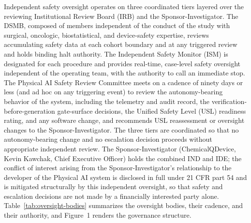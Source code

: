 Independent safety oversight operates on three coordinated tiers layered over the
reviewing Institutional Review Board (IRB) and the Sponsor-Investigator. The DSMB,
composed of members independent of the conduct of the study with surgical,
oncologic, biostatistical, and device-safety expertise, reviews accumulating safety
data at each cohort boundary and at any triggered review and holds binding halt
authority. The Independent Safety Monitor (ISM) is designated for each procedure and
provides real-time, case-level safety oversight independent of the operating team,
with the authority to call an immediate stop. The Physical AI Safety Review
Committee meets on a cadence of ninety days or less (and ad hoc on any triggering
event) to review the autonomy-bearing behavior of the system, including the
telemetry and audit record, the verification-before-generation gate-surface
decisions, the Unified Safety Level (USL) readiness rating, and any software change,
and recommends USL reassessment or oversight changes to the Sponsor-Investigator.
The three tiers are coordinated so that no autonomy-bearing change and no escalation
decision proceeds without appropriate independent review. The Sponsor-Investigator
(ChemicalQDevice, Kevin Kawchak, Chief Executive Officer) holds the combined IND and
IDE; the conflict of interest arising from the Sponsor-Investigator's relationship
to the developer of the Physical AI system is disclosed in full under 21 CFR part 54
and is mitigated structurally by this independent oversight, so that safety and
escalation decisions are not made by a financially interested party alone.
Table~\ref{tab:oversight-bodies} summarizes the oversight bodies, their cadence,
and their authority, and Figure~1 renders the governance structure.

